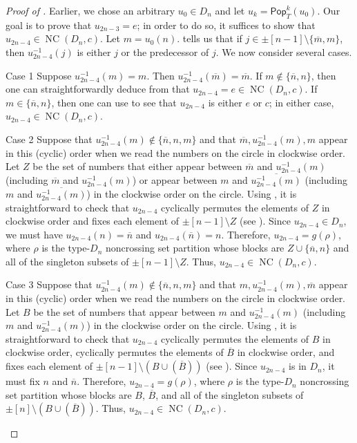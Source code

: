 \documentclass[ALCO,ThmDefs,Unicode,epreuves]{cedram}
\newcommand{\pop}{\mathsf{Pop}}
\DeclareMathOperator{\NC}{NC}
\begin{document}
\begin{proof}[Proof of ]
Earlier, we chose an arbitrary $u_0\in D_n$ and let $u_k=\pop_T^k(u_0)$. Our goal is to prove that $u_{2n-3}=e$; in order to do so, it suffices to show that $u_{2n-4}\in\NC(D_n,c)$. Let $m=u_0(n)$.  tells us that if $j\in\pm[n-1]\setminus\{\overline m,m\}$, then $u_{2n-4}^{-1}(j)$ is either $j$ or the predecessor of $j$. We now consider several cases. 




\begin{enonce*}[remark]{Case 1} Suppose $u_{2n-4}^{-1}(m)=m$. Then $u_{2n-4}^{-1}(\overline m)=\overline m$. If $m\not\in\{\overline n,n\}$, then one can straightforwardly deduce from  that $u_{2n-4}=e\in\NC(D_n,c)$. If $m\in\{\overline n,n\}$, then one can use  to see that $u_{2n-4}$ is either $e$ or $c$; in either case, $u_{2n-4}\in\NC(D_n,c)$. 
\end{enonce*}

\begin{enonce*}[remark]{Case 2} Suppose that $u_{2n-4}^{-1}(m)\not\in\{\overline n,n,m\}$ and that $\overline m, u_{2n-4}^{-1}(m),m$ appear in this (cyclic) order when we read the numbers on the circle in clockwise order. Let $Z$ be the set of numbers that either appear between $\overline m$ and $u_{2n-4}^{-1}(m)$ (including $\overline m$ and $u_{2n-4}^{-1}(m)$) or appear between $m$ and $\overline{u_{2n-4}^{-1}(m)}$ (including $m$ and $\overline{u_{2n-4}^{-1}(m)}$) in the clockwise order on the circle. Using , it is straightforward to check that $u_{2n-4}$ cyclically permutes the elements of $Z$ in clockwise order and fixes each element of $\pm[n-1]\setminus Z$ (see ). Since $u_{2n-4}\in D_n$, we must have $u_{2n-4}(n)=\overline n$ and $u_{2n-4}(\overline n)=n$. Therefore, $u_{2n-4}=g(\rho)$, where $\rho$ is the type-$D_n$ noncrossing set partition whose blocks are $Z\cup\{\overline n,n\}$ and all of the singleton subsets of $\pm[n-1]\setminus Z$. Thus, $u_{2n-4}\in\NC(D_n,c)$. 
\end{enonce*}

\begin{enonce*}[remark]{Case 3} Suppose that $u_{2n-4}^{-1}(m)\not\in\{\overline n,n,m\}$ and that $m, u_{2n-4}^{-1}(m),\overline m$ appear in this (cyclic) order when we read the numbers on the circle in clockwise order. Let $B$ be the set of numbers that appear between $m$ and $u_{2n-4}^{-1}(m)$ (including $m$ and $u_{2n-4}^{-1}(m)$) in the clockwise order on the circle. Using , it is straightforward to check that $u_{2n-4}$ cyclically permutes the elements of $B$ in clockwise order, cyclically permutes the elements of $\overline B$ in clockwise order, and fixes each element of $\pm[n-1]\setminus (B\cup(\overline B))$ (see ). Since $u_{2n-4}$ is in $ D_n$, it must fix $n$ and $\overline n$. Therefore, $u_{2n-4}=g(\rho)$, where $\rho$ is the type-$D_n$ noncrossing set partition whose blocks are $B$, $\overline B$, and all of the singleton subsets of $\pm[n]\setminus (B\cup(\overline B))$. Thus, $u_{2n-4}\in\NC(D_n,c)$.
\end{enonce*}


\end{proof}
\end{document}
